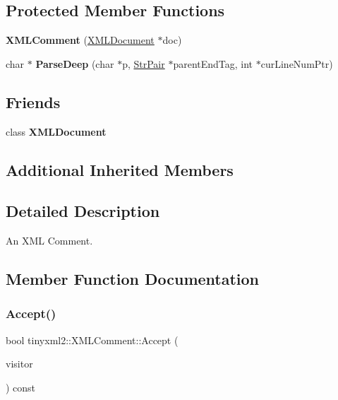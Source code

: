 \subsection*{Protected Member Functions}
\begin{DoxyCompactItemize}
\item 
\mbox{\label{classtinyxml2_1_1_x_m_l_comment_ae6463adc3edd93a8e5a9b2b7e99cdf91}} 
{\bfseries X\+M\+L\+Comment} (\mbox{\hyperlink{classtinyxml2_1_1_x_m_l_document}{X\+M\+L\+Document}} $\ast$doc)
\item 
\mbox{\label{classtinyxml2_1_1_x_m_l_comment_a3430281eed8d1023bafa9e633f44f509}} 
char $\ast$ {\bfseries Parse\+Deep} (char $\ast$p, \mbox{\hyperlink{classtinyxml2_1_1_str_pair}{Str\+Pair}} $\ast$parent\+End\+Tag, int $\ast$cur\+Line\+Num\+Ptr)
\end{DoxyCompactItemize}
\subsection*{Friends}
\begin{DoxyCompactItemize}
\item 
\mbox{\label{classtinyxml2_1_1_x_m_l_comment_a4eee3bda60c60a30e4e8cd4ea91c4c6e}} 
class {\bfseries X\+M\+L\+Document}
\end{DoxyCompactItemize}
\subsection*{Additional Inherited Members}


\subsection{Detailed Description}
An X\+ML Comment. 

\subsection{Member Function Documentation}
\mbox{\label{classtinyxml2_1_1_x_m_l_comment_a27b37d16cea01b5329dfbbb4f9508e39}} 
\subsubsection{\texorpdfstring{Accept()}{Accept()}}
{\footnotesize\ttfamily bool tinyxml2\+::\+X\+M\+L\+Comment\+::\+Accept (\begin{DoxyParamCaption}\item[{\mbox{\hyperlink{classtinyxml2_1_1_x_m_l_visitor}{X\+M\+L\+Visitor}} $\ast$}]{visitor }\end{DoxyParamCaption}) const\hspace{0.3cm}{\ttfamily [virtual]}}

